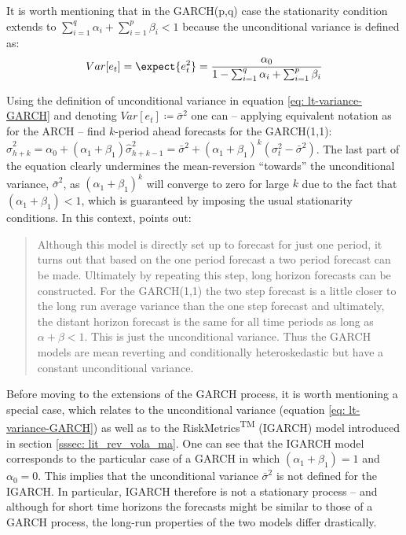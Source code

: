 It is worth mentioning that in the GARCH(p,q) case the stationarity condition extends to $\sum_{i=1}^q \alpha_i + \sum_{i=1}^p \beta_i  < 1$ because the unconditional variance is defined as: 
\begin{equation}
\label{eq: lt-variance-GARCH}
Var[e_t] = \expect{e_t^2} = \dfrac{\alpha_0}{1- \sum_{i=1}^q \alpha_i + \sum_{i=1}^p \beta_i}
\end{equation}

Using the definition of unconditional variance in equation \eqref{eq: lt-variance-GARCH} and denoting $Var[e_t] \coloneqq \bar{\sigma}^2$ one can -- applying equivalent notation as for the ARCH -- find  $k$-period ahead forecasts for the GARCH(1,1): $\hat{\sigma}_{h+k}^2 = \alpha_0 + (\alpha_1 + \beta_1) \hat{\sigma}_{h+k-1}^2 = \bar{\sigma}^2 + (\alpha_1 + \beta_1)^k (\sigma_t^2 - \bar{\sigma}^2)$. The last part of the equation clearly undermines the mean-reversion \enquote{towards} the unconditional variance, $\bar{\sigma}^2$, as $(\alpha_1 + \beta_1)^k$ will converge to zero for large $k$ due to the fact that $(\alpha_1 + \beta_1) < 1$, which is guaranteed by imposing the usual stationarity conditions. In this context, \textcite[8]{Engle2001} points out: 
\blockquote{Although this model is directly set up to forecast for just one period, it turns out that based on the one period forecast a two period forecast can be made. Ultimately by repeating this step, long horizon forecasts can be constructed. For the GARCH(1,1) the two step forecast is a little closer to the long run average variance than the one step forecast and ultimately, the distant horizon forecast is the same for all time periods as long as $\alpha + \beta < 1$. This is just the unconditional variance. Thus the GARCH models are mean reverting and conditionally heteroskedastic but have a constant unconditional variance.}

Before moving to the extensions of the GARCH process, it is worth mentioning a special case, which relates to the unconditional variance (equation \eqref{eq: lt-variance-GARCH}) as well as to the RiskMetrics\textsuperscript{TM} (IGARCH) model introduced in section \ref{sssec: lit_rev_vola_ma}. One can see that the IGARCH model corresponds to the particular case of a GARCH in which $(\alpha_1 + \beta_1) = 1$ and $\alpha_0 = 0$. This implies that the unconditional variance $\bar{\sigma}^2 $ is not defined for the IGARCH. In particular, IGARCH therefore is not a stationary process -- and although for short time horizons the forecasts might be similar to those of a GARCH process, the long-run properties of the two models differ drastically. 

